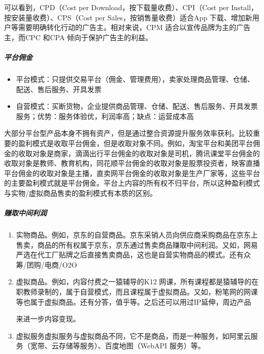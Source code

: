 \documentclass[letterpaper,10pt,english]{sphinxmanual}
\begin{document}
可以看到，CPD（Cost per Download，按下载量收费）、CPI（Cost per
Install，按安装量收费）、CPS（Cost per Sales，按销售量收费）适合App
下载、增加新用户等需要明确转化行动的广告主。相对来说，CPM
适合以宣传品牌为主的广告主，而CPC 和CPA 倾向于保护广告主的利益。


\subparagraph{平台佣金}
\label{\detokenize{chapter_introduction/money:id11}}\begin{itemize}
\item {} 
平台模式：只提供交易平台（佣金、管理费用），卖家处理商品管理、仓储、配送、售后服务、开具发票

\item {} 
自营模式：买断货物，企业提供商品管理、仓储、配送、售后服务、开具发票服务；优势：服务体验优，利润率高；缺点：运营成本高

\end{itemize}

大部分平台型产品本身不拥有资产，但是通过整合资源提升服务效率获利。比较重要的盈利模式是收取平台佣金，但是收取对象不同。例如，淘宝平台和美团平台佣金的收取对象是商家，滴滴出行平台佣金的收取对象是司机，腾讯课堂平台佣金的收取对象是教师、教育机构，同花顺平台佣金的收取对象是股票投资者，映客直播平台佣金的收取对象是主播，直卖网平台佣金的收取对象是生产厂家等，这些平台的主要盈利模式就是平台佣金。平台上内容的所有权不归平台，所以这种盈利模式与实物/虚拟商品售卖的盈利模式有本质的区别。


\subparagraph{赚取中间利润}
\label{\detokenize{chapter_introduction/money:id12}}\begin{enumerate}
%
\item {} 
实物商品。例如，京东的自营商品。京东采销人员向供应商采购商品在京东上售卖，商品的所有权属于京东，京东通过售卖商品赚取中间利润。又如，网易严选在代工厂贴牌之后直接售卖商品，这也是自营实物商品的模式。还有众筹/团购/电商/O2O%
\begin{footnote}[147]\sphinxAtStartFootnote
{}
%
\end{footnote}

\item {} 
虚拟商品。例如，内容付费之一猿辅导的K12
网课，所有课程都是猿辅导的在职教师录制的，属于自营模式，而且课程属于虚拟商品。又如，粉笔网的网课等也属于虚拟商品。还有分答，值乎等。之后还可以用过IP延伸，周边产品%
\begin{footnote}[148]\sphinxAtStartFootnote
{}
%
\end{footnote}来进一步内容变现。

\item {} 
虚拟服务虚拟服务与虚拟商品不同，它不是商品，而是一种服务，如阿里云服务（宽带、云存储等服务）、百度地图（WebAPI
服务）等。

\end{enumerate}
\end{document}
